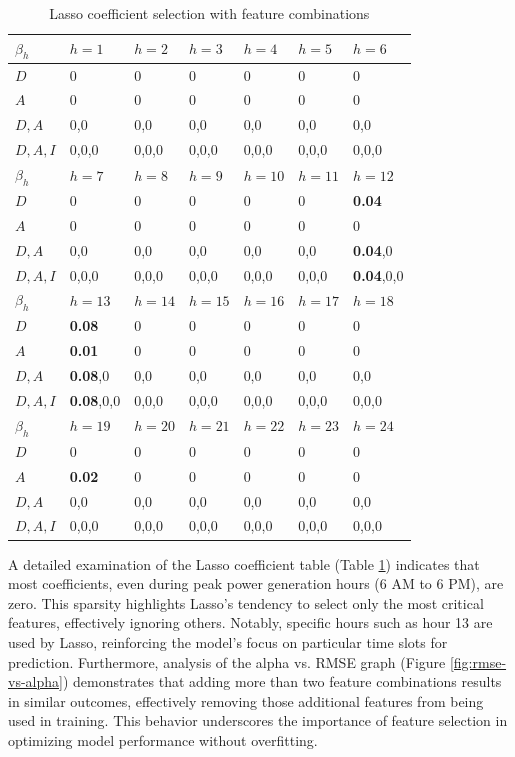 \begin{table}[h]
    \centering
    \caption{Lasso coefficient selection with feature combinations}
    \begin{tabular}{|l|l|l|l|l|l|l|} 
    \hline
    $\beta_h$ & $h=1$ & $h=2$ & $h=3$ & $h=4$ & $h=5$ & $h=6$ \\ 
    \hline
    $D$ & 0 & 0 & 0 & 0 & 0 & 0 \\ 
    \hline
    $A$ & 0 & 0 & 0 & 0 & 0 & 0 \\ 
    \hline
    $D,A$ & 0,0 & 0,0 & 0,0 & 0,0 & 0,0 & 0,0 \\ 
    \hline
    $D,A,I$ & 0,0,0 & 0,0,0 & 0,0,0 & 0,0,0 & 0,0,0 & 0,0,0 \\ 
    \hline
    $\beta_h$ & $h=7$ & $h=8$ & $h=9$ & $h=10$ & $h=11$ & $h=12$ \\ 
    \hline
    $D$ & 0 & 0 & 0 & 0 & 0 & \textbf{0.04} \\ 
    \hline
    $A$ & 0 & 0 & 0 & 0 & 0 & 0 \\ 
    \hline
    $D,A$ & 0,0 & 0,0 & 0,0 & 0,0 & 0,0 & \textbf{0.04},0 \\ 
    \hline
    $D,A,I$ & 0,0,0 & 0,0,0 & 0,0,0 & 0,0,0 & 0,0,0 & \textbf{0.04},0,0 \\ 
    \hline
    $\beta_h$ & $h=13$ & $h=14$ & $h=15$ & $h=16$ & $h=17$ & $h=18$ \\ 
    \hline
    $D$ & \textbf{0.08} & 0 & 0 & 0 & 0 & 0 \\ 
    \hline
    $A$ & \textbf{0.01} & 0 & 0 & 0 & 0 & 0 \\ 
    \hline
    $D,A$ & \textbf{0.08},0 & 0,0 & 0,0 & 0,0 & 0,0 & 0,0 \\ 
    \hline
    $D,A,I$ & \textbf{0.08},0,0 & 0,0,0 & 0,0,0 & 0,0,0 & 0,0,0 & 0,0,0 \\ 
    \hline
    $\beta_h$ & $h=19$ & $h=20$ & $h=21$ & $h=22$ & $h=23$ & $h=24$ \\ 
    \hline
    $D$ & 0 & 0 & 0 & 0 & 0 & 0 \\ 
    \hline
    $A$ & \textbf{0.02} & 0 & 0 & 0 & 0 & 0 \\ 
    \hline
    $D,A$ & 0,0 & 0,0 & 0,0 & 0,0 & 0,0 & 0,0 \\ 
    \hline
    $D,A,I$ & 0,0,0 & 0,0,0 & 0,0,0 & 0,0,0 & 0,0,0 & 0,0,0 \\ 
    \hline
    \end{tabular}
    \label{tab:coeff_lasso}
\end{table}

A detailed examination of the Lasso coefficient table (Table \ref{tab:coeff_lasso}) indicates that most coefficients, even during peak power generation hours (6 AM to 6 PM), are zero. This sparsity highlights Lasso's tendency to select only the most critical features, effectively ignoring others. Notably, specific hours such as hour 13 are used by Lasso, reinforcing the model's focus on particular time slots for prediction. Furthermore, analysis of the alpha vs. RMSE graph (Figure \ref{fig:rmse-vs-alpha}) demonstrates that adding more than two feature combinations results in similar outcomes, effectively removing those additional features from being used in training. This behavior underscores the importance of feature selection in optimizing model performance without overfitting.

